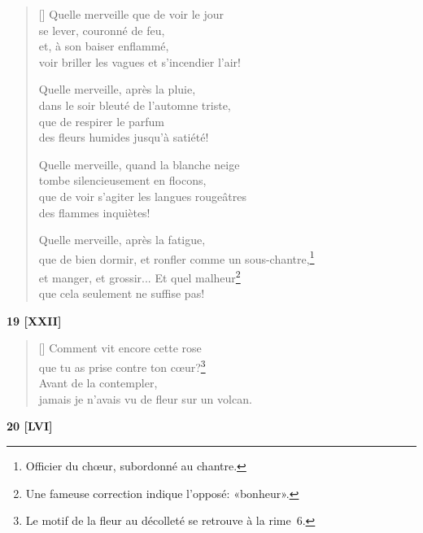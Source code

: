 \documentclass[a4paper,12pt]{book}
\begin{document}
\begin{verse}[\versewidth]
  Quelle merveille que de voir le jour \\
  se lever, couronné de feu, \\
  et, à son baiser enflammé, \\
  voir briller les vagues et s'incendier l'air!

  Quelle merveille, après la pluie, \\
  dans le soir bleuté de l'automne triste, \\
  que de respirer le parfum \\
  des fleurs humides jusqu'à satiété!

  Quelle merveille, quand la blanche neige \\
  tombe silencieusement en flocons, \\
  que de voir s'agiter les langues rougeâtres \\
  des flammes inquiètes!

  Quelle merveille, après la fatigue, \\
  que de bien dormir, et ronfler comme un
  sous-chantre,\footnote{Officier du chœur, subordonné au chantre.} \\
  et manger, et grossir... Et quel malheur\footnote{Une fameuse
  correction indique l'opposé: «bonheur».} \\
  que cela seulement ne suffise pas!
\end{verse}

\bigskip

\begin{center}
  \textbf{19 [XXII]}
\end{center}

\settowidth{\versewidth}{Comment vit cette rose que tu as prise}

\begin{verse}[\versewidth]
  Comment vit encore cette rose \\
  que tu as prise contre ton cœur?\footnote{Le motif de la fleur au
  décolleté se retrouve à la rime~6.} \\
  Avant de la contempler, \\
  jamais je n'avais vu de fleur sur un volcan.
\end{verse}

\bigskip

\begin{center}
  \textbf{20 [LVI]}
\end{center}
\end{document}
